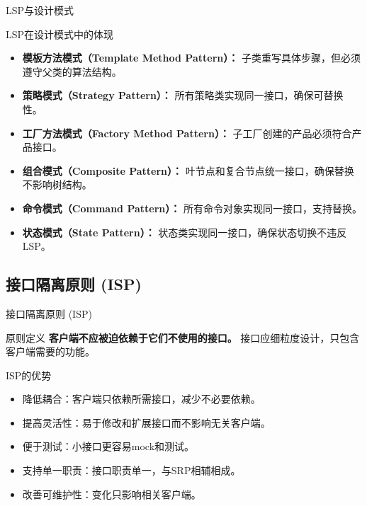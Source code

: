 \documentclass[UTF8,aspectratio=169]{beamer}
\begin{document}
\begin{frame}{LSP与设计模式}
    \begin{ytublock}{LSP在设计模式中的体现}
        \begin{itemize}
            \item \textbf{模板方法模式（Template Method Pattern）：} 子类重写具体步骤，但必须遵守父类的算法结构。
            \item \textbf{策略模式（Strategy Pattern）：} 所有策略类实现同一接口，确保可替换性。
            \item \textbf{工厂方法模式（Factory Method Pattern）：} 子工厂创建的产品必须符合产品接口。
            \item \textbf{组合模式（Composite Pattern）：} 叶节点和复合节点统一接口，确保替换不影响树结构。
            \item \textbf{命令模式（Command Pattern）：} 所有命令对象实现同一接口，支持替换。
            \item \textbf{状态模式（State Pattern）：} 状态类实现同一接口，确保状态切换不违反LSP。
        \end{itemize}
    \end{ytublock}
\end{frame}

\subsection{接口隔离原则 (ISP)}

\begin{frame}{接口隔离原则 (ISP)}
    \begin{ytublock}{原则定义}
        \textbf{客户端不应被迫依赖于它们不使用的接口。}
        接口应细粒度设计，只包含客户端需要的功能。
    \end{ytublock}
    \begin{ytublock}{ISP的优势}
        \begin{itemize}
            \item 降低耦合：客户端只依赖所需接口，减少不必要依赖。
            \item 提高灵活性：易于修改和扩展接口而不影响无关客户端。
            \item 便于测试：小接口更容易mock和测试。
            \item 支持单一职责：接口职责单一，与SRP相辅相成。
            \item 改善可维护性：变化只影响相关客户端。
        \end{itemize}
    \end{ytublock}
\end{frame}
\end{document}
